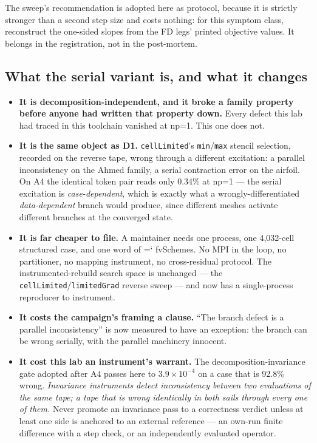 \documentclass[11pt,a4paper]{article}
\newcommand{\artifact}[1]{{\small\ttfamily\hyphenchar\font=`\-\relax
  \def\_{\textunderscore\allowbreak}#1}}
\begin{document}
\noindent
The sweep's recommendation is adopted here as protocol, because it is strictly stronger than a
second step size and costs nothing: for this symptom class, reconstruct the one-sided slopes
from the FD legs' printed objective values. It belongs in the registration, not in the
post-mortem.

\subsection{What the serial variant is, and what it changes}

\begin{itemize}
\item \textbf{It is decomposition-independent, and it broke a family property before anyone
had written that property down.} Every defect this lab had traced in this toolchain vanished
at np=1. This one does not.
\item \textbf{It is the same object as D1.} \texttt{cellLimited}'s \texttt{min}/\texttt{max}
stencil selection, recorded on the reverse tape, wrong through a different excitation: a
parallel inconsistency on the Ahmed family, a serial contraction error on the airfoil. On A4
the identical token pair reads only 0.34\% at np=1 --- the serial excitation is
\emph{case-dependent}, which is exactly what a wrongly-differentiated \emph{data-dependent}
branch would produce, since different meshes activate different branches at the converged
state.
\item \textbf{It is far cheaper to file.} A maintainer needs one process, one 4{,}032-cell
structured case, and one word of \artifact{fvSchemes}. No MPI in the loop, no partitioner, no
mapping instrument, no cross-residual protocol. The instrumented-rebuild search space is
unchanged --- the \texttt{cellLimited}/\texttt{limitedGrad} reverse sweep --- and now has a
single-process reproducer to instrument.
\item \textbf{It costs the campaign's framing a clause.} ``The branch defect is a parallel
inconsistency'' is now measured to have an exception: the branch can be wrong serially, with
the parallel machinery innocent.
\item \textbf{It cost this lab an instrument's warrant.} The decomposition-invariance gate
adopted after A4 passes here to \(3.9\times10^{-4}\) on a case that is 92.8\% wrong.
\emph{Invariance instruments detect inconsistency between two evaluations of the same tape; a
tape that is wrong identically in both sails through every one of them.} Never promote an
invariance pass to a correctness verdict unless at least one side is anchored to an external
reference --- an own-run finite difference with a step check, or an independently evaluated
operator.
\end{itemize}
\end{document}
